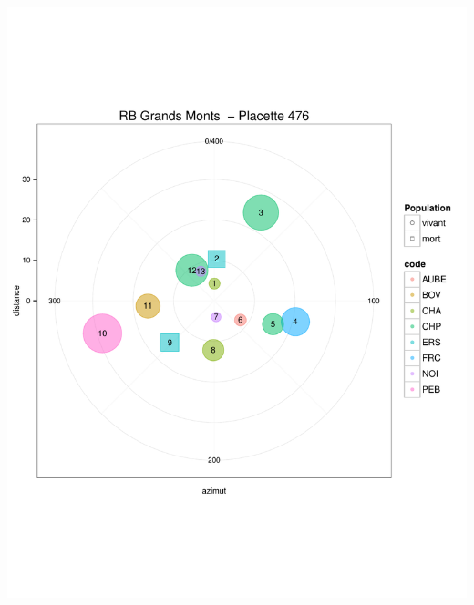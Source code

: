 \documentclass[a4paper]{book}\usepackage[]{graphicx}\usepackage[]{color}
\makeatletter
\def\maxwidth{ %
  \ifdim\Gin@nat@width>\linewidth
    \linewidth
  \else
    \Gin@nat@width
  \fi
}
\newenvironment{knitrout}{}{} %
\makeatother
\begin{document}
\begin{knitrout}
{\centering \includegraphics[width=\maxwidth]{Figures/PlanArbres-54} 

}





\end{knitrout}
\end{document}
